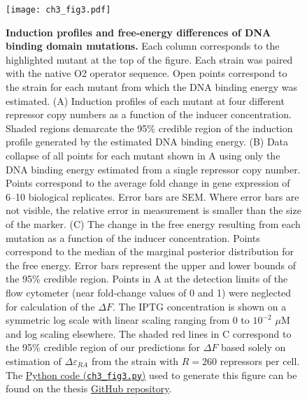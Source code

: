 \documentclass[12pt]{caltech_thesis}
\begin{document}
\hypertarget{fig:DNA_muts}{%
\begin{figure}
\centering
\texttt{[image: ch3\_fig3.pdf]}
\caption[{Induction profiles and free-energy differences of DNA binding
domain mutations in the \emph{lac} repressor.}]{\textbf{Induction
profiles and free-energy differences of DNA binding domain mutations.}
Each column corresponds to the highlighted mutant at the top of the
figure. Each strain was paired with the native O2 operator sequence.
Open points correspond to the strain for each mutant from which the DNA
binding energy was estimated. (A) Induction profiles of each mutant at
four different repressor copy numbers as a function of the inducer
concentration. Shaded regions demarcate the 95\% credible region of the
induction profile generated by the estimated DNA binding energy. (B)
Data collapse of all points for each mutant shown in A using only the
DNA binding energy estimated from a single repressor copy number. Points
correspond to the average fold change in gene expression of 6--10
biological replicates. Error bars are SEM. Where error bars are not
visible, the relative error in measurement is smaller than the size of
the marker. (C) The change in the free energy resulting from each
mutation as a function of the inducer concentration. Points correspond
to the median of the marginal posterior distribution for the free
energy. Error bars represent the upper and lower bounds of the 95\%
credible region. Points in A at the detection limits of the flow
cytometer (near fold-change values of 0 and 1) were neglected for
calculation of the \(\Delta F\). The IPTG concentration is shown on a
symmetric log scale with linear scaling ranging from 0 to \(10^{-2}\)
\(\mu\)M and log scaling elsewhere. The shaded red lines in C correspond
to the 95\% credible region of our predictions for \(\Delta F\) based
solely on estimation of \(\Delta\varepsilon_{RA}\) from the strain with
\(R = 260\) repressors per cell. The
\href{https://github.com/gchure/phd/blob/master/src/chapter_03/code/ch3_fig3.py}{Python
code (\texttt{ch3\_fig3.py})} used to generate this figure can be found
on the thesis \href{https://github.com/gchure/phd}{GitHub repository}.}
\label{fig:DNA_muts}
\end{figure}
}
\end{document}
